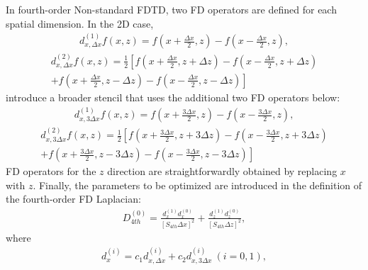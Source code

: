             In fourth-order Non-standard FDTD, two FD operators are defined for each spatial dimension. In the 2D case,
            \begin{align} \label{eq:fdtd_12}
                d^{(1)}_{x,\Delta x}f(x,z)=f\left(x+\frac{\Delta x}{2},z\right)-f\left(x-\frac{\Delta x}{2},z\right),
            \end{align}
\vspace*{-7mm}
            \begin{align} \label{eq:fdtd_13}
                d^{(2)}_{x,\Delta x}f(x,z)=\frac{1}{2}\left[f\left(x+\frac{\Delta x}{2},z+\Delta z\right)-f\left(x-\frac{\Delta x}{2},z+\Delta z\right) \right.
\nonumber \\
                \left. +f\left(x+\frac{\Delta x}{2},z-\Delta z\right)-f\left(x-\frac{\Delta x}{2},z-\Delta z\right)\right]
            \end{align}
            \cite{JafarGandomi2009NonstandardFDTD} introduce a broader stencil that uses the additional two FD operators below:
            \begin{align} \label{eq:fdtd_14}
                d^{(1)}_{x,3\Delta x}f(x,z)=f\left(x+\frac{3\Delta x}{2},z\right)-f\left(x-\frac{3\Delta x}{2},z\right),
            \end{align}
\vspace*{-7mm}
            \begin{align} \label{eq:fdtd_15}
                d^{(2)}_{x,3\Delta x}f(x,z)=\frac{1}{2}\left[f\left(x+\frac{3\Delta x}{2},z+3\Delta z\right)-f\left(x-\frac{3\Delta x}{2},z+3\Delta z\right)
\right. \nonumber \\
                \left. +f\left(x+\frac{3\Delta x}{2},z-3\Delta z\right)-f\left(x-\frac{3\Delta x}{2},z-3\Delta z\right)\right]
            \end{align}
            FD operators for the $z$ direction are straightforwardly obtained by replacing $x$ with $z$.
            Finally, the parameters to be optimized are introduced in the definition of the fourth-order FD Laplacian:
            \begin{align} \label{eq:fdtd_16}
                D^{(0)}_{4th}=\frac{d^{(1)}_x d^{(0)}_x}{[S_{4th} \Delta x]^2}+\frac{d^{(1)}_z d^{(0)}_z}{[S_{4th} \Delta z]^2},
            \end{align}
            where
            \begin{align} \label{eq:fdtd_17}
                d^{(i)}_x = c_1 d^{(i)}_{x, \Delta x} + c_2 d^{(i)}_{x,3\Delta x}\ (i=0,1),
            \end{align}
